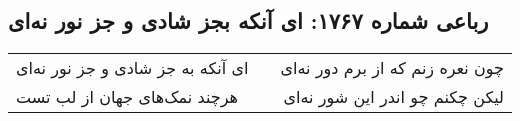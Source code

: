 \begin{center}
\section*{رباعی شماره ۱۷۶۷: ای آنکه بجز شادی و جز نور نه‌ای}
\label{sec:1767}
\begin{longtable}{l p{0.5cm} r}
ای آنکه به جز شادی و جز نور نه‌ای
&&
چون نعره زنم که از برم دور نه‌ای
\\
هرچند نمک‌های جهان از لب تست
&&
لیکن چکنم چو اندر این شور نه‌ای
\\
\end{longtable}
\end{center}
